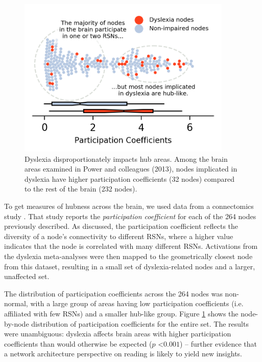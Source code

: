 \begin{figure}[t]
\centering
\includegraphics[height=3in]{images/ch1-dyslexia-hubs.png}
    \caption[Dyslexia disproportionately impacts hub areas.]{Dyslexia disproportionately impacts hub areas. Among the brain areas examined in Power and colleagues (2013), nodes implicated in dyslexia have higher participation coefficients (32 nodes) compared to the rest of the brain (232 nodes).}
\label{fig:ch1-dyslexia-hubs}
\end{figure}

To get measures of hubness across the brain, we used data from a connectomics study \citep{Power2013}. That study reports the \textit{participation coefficient} for each of the 264 nodes previously described. As discussed, the participation coefficient reflects the diversity of a node's connectivity to different RSNs, where a higher value indicates that the node is correlated with many different RSNs. Activations from the dyslexia meta-analyses were then mapped to the geometrically closest node from this dataset, resulting in a small set of dyslexia-related nodes and a larger, unaffected set.

The distribution of participation coefficients across the 264 nodes was non-normal, with a large group of areas having low participation coefficients (i.e. affiliated with few RSNs) and a smaller hub-like group. Figure \ref{fig:ch1-dyslexia-hubs} shows the node-by-node distribution of participation coefficients for the entire set. The results were unambiguous: dyslexia affects brain areas with higher participation coefficients than would otherwise be expected ($p$ \textless $0.001$) -- further evidence that a network architecture perspective on reading is likely to yield new insights. 


